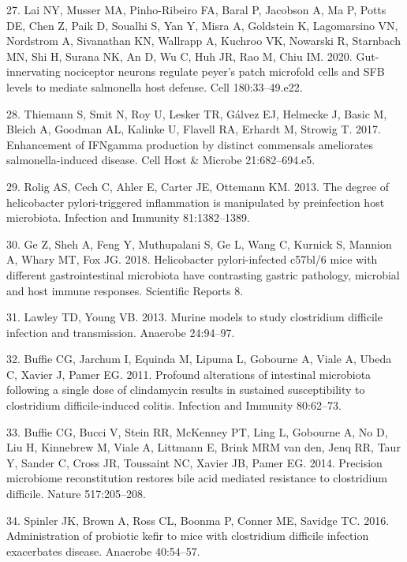 \documentclass[11pt,]{article}
\begin{document}
\hypertarget{ref-Lai2020}{}
27. Lai NY, Musser MA, Pinho-Ribeiro FA, Baral P, Jacobson A, Ma P,
Potts DE, Chen Z, Paik D, Soualhi S, Yan Y, Misra A, Goldstein K,
Lagomarsino VN, Nordstrom A, Sivanathan KN, Wallrapp A, Kuchroo VK,
Nowarski R, Starnbach MN, Shi H, Surana NK, An D, Wu C, Huh JR, Rao M,
Chiu IM. 2020. Gut-innervating nociceptor neurons regulate peyer's patch
microfold cells and SFB levels to mediate salmonella host defense. Cell
180:33--49.e22.

\hypertarget{ref-Thiemann2017}{}
28. Thiemann S, Smit N, Roy U, Lesker TR, Gálvez EJ, Helmecke J, Basic
M, Bleich A, Goodman AL, Kalinke U, Flavell RA, Erhardt M, Strowig T.
2017. Enhancement of IFNgamma production by distinct commensals
ameliorates salmonella-induced disease. Cell Host \& Microbe
21:682--694.e5.

\hypertarget{ref-Rolig2013}{}
29. Rolig AS, Cech C, Ahler E, Carter JE, Ottemann KM. 2013. The degree
of helicobacter pylori-triggered inflammation is manipulated by
preinfection host microbiota. Infection and Immunity 81:1382--1389.

\hypertarget{ref-Ge2018}{}
30. Ge Z, Sheh A, Feng Y, Muthupalani S, Ge L, Wang C, Kurnick S,
Mannion A, Whary MT, Fox JG. 2018. Helicobacter pylori-infected c57bl/6
mice with different gastrointestinal microbiota have contrasting gastric
pathology, microbial and host immune responses. Scientific Reports 8.

\hypertarget{ref-Lawley2013}{}
31. Lawley TD, Young VB. 2013. Murine models to study clostridium
difficile infection and transmission. Anaerobe 24:94--97.

\hypertarget{ref-Buffie2011}{}
32. Buffie CG, Jarchum I, Equinda M, Lipuma L, Gobourne A, Viale A,
Ubeda C, Xavier J, Pamer EG. 2011. Profound alterations of intestinal
microbiota following a single dose of clindamycin results in sustained
susceptibility to clostridium difficile-induced colitis. Infection and
Immunity 80:62--73.

\hypertarget{ref-Buffie2014}{}
33. Buffie CG, Bucci V, Stein RR, McKenney PT, Ling L, Gobourne A, No D,
Liu H, Kinnebrew M, Viale A, Littmann E, Brink MRM van den, Jenq RR,
Taur Y, Sander C, Cross JR, Toussaint NC, Xavier JB, Pamer EG. 2014.
Precision microbiome reconstitution restores bile acid mediated
resistance to clostridium difficile. Nature 517:205--208.

\hypertarget{ref-Spinler2016}{}
34. Spinler JK, Brown A, Ross CL, Boonma P, Conner ME, Savidge TC. 2016.
Administration of probiotic kefir to mice with clostridium difficile
infection exacerbates disease. Anaerobe 40:54--57.
\end{document}
